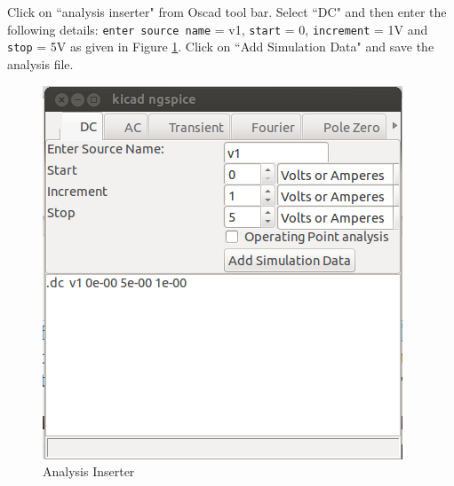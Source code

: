 \begin{enumerate}
Click on ``analysis inserter" from Oscad tool bar. Select ``DC" and then enter the following details: {\tt enter source name} = v1, {\tt start} = 0, {\tt increment} = 1V and {\tt stop} = 5V as given in Figure \ref{apd12}. Click on ``Add Simulation Data" and save the analysis file.

\begin{figure}
\begin{center}
\includegraphics[width=0.7\linewidth]{figures/apd12.png}
\caption{Analysis Inserter}
\label{apd12}
\end{center}
\end{figure}


\end{enumerate}
